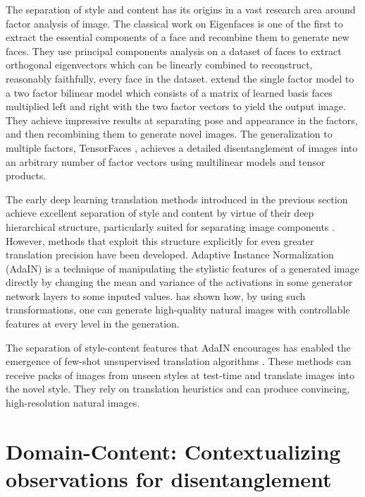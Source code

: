 \documentclass[withindex,glossary,firstyr,times]{cam-thesis}
\begin{document}
The separation of style and content has its origins in a vast research area around factor analysis of image. The classical work on Eigenfaces \cite{sirovich1987low} is one of the first to extract the essential components of a face and recombine them to generate new faces. They use principal components analysis on a dataset of faces to extract orthogonal eigenvectors which can be linearly combined to reconstruct, reasonably faithfully, every face in the dataset. \citet{tenenbaum2000separating} extend the single factor model to a two factor bilinear model which consists of a matrix of learned basis faces multiplied left and right with the two factor vectors to yield the output image. They achieve impressive results at separating pose and appearance in the factors, and then recombining them to generate novel images. The generalization to multiple factors, TensorFaces \cite{vasilescu2002multilinear}, achieves a detailed disentanglement of images into an arbitrary number of factor vectors using multilinear models and tensor products.

The early deep learning translation methods introduced in the previous section \cite{taigman2016unsupervised, zhu2017unpaired, liu2017unsupervised} achieve excellent separation of style and content by virtue of their deep hierarchical structure, particularly suited for separating image components \cite{ulyanov2018deep}. However, methods that exploit this structure explicitly for even greater translation precision have been developed. Adaptive Instance Normalization (AdaIN) \cite{huang2017arbitrary} is a technique of manipulating the stylistic features of a generated image directly by changing the mean and variance of the activations in some generator network layers to some inputed values. \citet{karras2019style} has shown how, by using such transformations, one can generate high-quality natural images with controllable features at every level in the generation.

The separation of style-content features that AdaIN encourages has enabled the emergence of few-shot unsupervised translation algorithms \cite{wang2019few, liu2019few}. These methods can receive packs of images from unseen styles at test-time and translate images into the novel style. They rely on translation heuristics and can produce convincing, high-resolution natural images.

\section{Domain-Content: Contextualizing observations for disentanglement}
\end{document}
